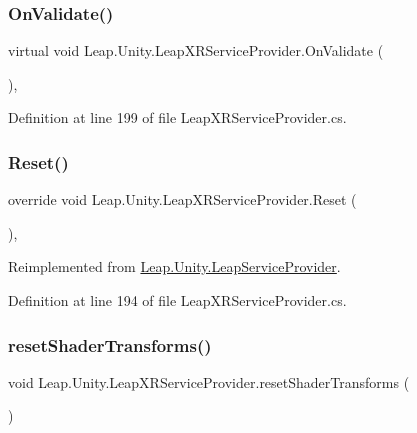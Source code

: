 \subsubsection{\texorpdfstring{OnValidate()}{OnValidate()}}
{\footnotesize\ttfamily virtual void Leap.\+Unity.\+Leap\+X\+R\+Service\+Provider.\+On\+Validate (\begin{DoxyParamCaption}{ }\end{DoxyParamCaption})\hspace{0.3cm}{\ttfamily [protected]}, {\ttfamily [virtual]}}



Definition at line 199 of file Leap\+X\+R\+Service\+Provider.\+cs.

\mbox{\label{class_leap_1_1_unity_1_1_leap_x_r_service_provider_abe79fe929f415f66f157d108b3f27aa5}} 
\subsubsection{\texorpdfstring{Reset()}{Reset()}}
{\footnotesize\ttfamily override void Leap.\+Unity.\+Leap\+X\+R\+Service\+Provider.\+Reset (\begin{DoxyParamCaption}{ }\end{DoxyParamCaption})\hspace{0.3cm}{\ttfamily [protected]}, {\ttfamily [virtual]}}



Reimplemented from \mbox{\hyperlink{class_leap_1_1_unity_1_1_leap_service_provider_af249b412176e1018f24d4628cb476316}{Leap.\+Unity.\+Leap\+Service\+Provider}}.



Definition at line 194 of file Leap\+X\+R\+Service\+Provider.\+cs.

\mbox{\label{class_leap_1_1_unity_1_1_leap_x_r_service_provider_a9155994dde86e3946890433bfc536b9a}} 
\subsubsection{\texorpdfstring{resetShaderTransforms()}{resetShaderTransforms()}}
{\footnotesize\ttfamily void Leap.\+Unity.\+Leap\+X\+R\+Service\+Provider.\+reset\+Shader\+Transforms (\begin{DoxyParamCaption}{ }\end{DoxyParamCaption})\hspace{0.3cm}{\ttfamily [protected]}}



